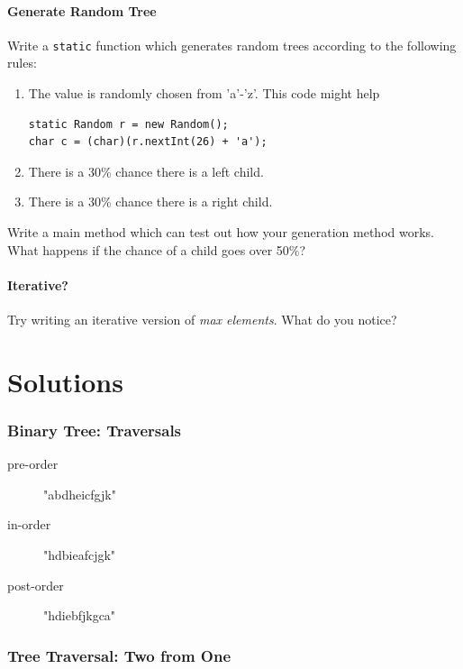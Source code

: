 \documentclass[twoside=false,DIV=14]{scrartcl}
\begin{document}
\subsection{Generate Random Tree}
Write a \verb+static+ function which generates random trees according to the following rules:
\begin{enumerate}
    \item The value is randomly chosen from 'a'-'z'.  This code might help
    \begin{lstlisting}
static Random r = new Random();
char c = (char)(r.nextInt(26) + 'a');
    \end{lstlisting}
    \item There is a 30\% chance there is a left child.
    \item There is a 30\% chance there is a right child.
\end{enumerate}
Write a main method which can test out how your generation method works.  What happens if the chance of a child goes over 50\%?

\subsection{Iterative?}
Try writing an iterative version of \emph{max elements}.  What do you notice?

\newpage\setcounter{section}{0}
\part*{Solutions}

\section{Binary Tree: Traversals}
\begin{description}
    \item[pre-order] "abdheicfgjk"
    \item[in-order] "hdbieafcjgk"
    \item[post-order] "hdiebfjkgca"   
\end{description}

\section{Tree Traversal: Two from One}
\end{document}
